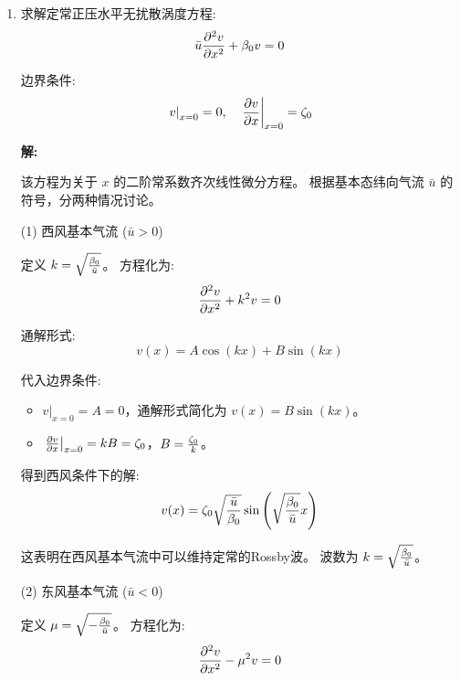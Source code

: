 \begin{enumerate}
\begin{itemize}
        此时波速依赖于波数，表现为频散波。
    \end{itemize}

    \qed

    \item 求解定常正压水平无扰散涡度方程:
    \begin{equation*}
        \bar{u} \pde[2]{v}{x} + \rossby_0 v = 0
    \end{equation*}

    边界条件:
    \begin{equation*}
        \left.v\right|_{x = 0} = 0, \quad \left.\pde{v}{x}\right|_{x = 0} = \relvort_0
    \end{equation*}

    \vspace{1em}
    \textbf{解:}

    该方程为关于 $x$ 的二阶常系数齐次线性微分方程。
    根据基本态纬向气流 $\bar{u}$ 的符号，分两种情况讨论。

    (1) 西风基本气流 ($\bar{u} > 0$)

    定义 $k = \sqrt{\frac{\beta_0}{\bar{u}}}$。
    方程化为:
    \begin{equation*}
        \pde[2]{v}{x} + k^2 v = 0
    \end{equation*}

    通解形式:
    \begin{equation*}
        v(x) = A \cos(k x) + B \sin(k x)
    \end{equation*}

    代入边界条件:
    \begin{itemize}
        \item $\left.v\right|_{x = 0} = A = 0$，通解形式简化为 $v(x) = B \sin(k x)$。

        \item $\left.\pde{v}{x}\right|_{x = 0} = k B = \relvort_0$，$B = \frac{\zeta_0}{k}$。
    \end{itemize}

    得到西风条件下的解:
    \begin{equation*}
        v(x) = \zeta_0 \sqrt{\frac{\bar{u}}{\beta_0}} \sin\left(\sqrt{\frac{\beta_0}{\bar{u}}} x\right)
    \end{equation*}

    这表明在西风基本气流中可以维持定常的Rossby波。
    波数为 $k = \sqrt{\frac{\beta_0}{\bar{u}}}$。

    (2) 东风基本气流 ($\bar{u} < 0$)

    定义 $\mu = \sqrt{-\frac{\beta_0}{\bar{u}}}$。
    方程化为:
    \begin{equation*}
        \pde[2]{v}{x} - \mu^2 v = 0
    \end{equation*}


\end{enumerate}
